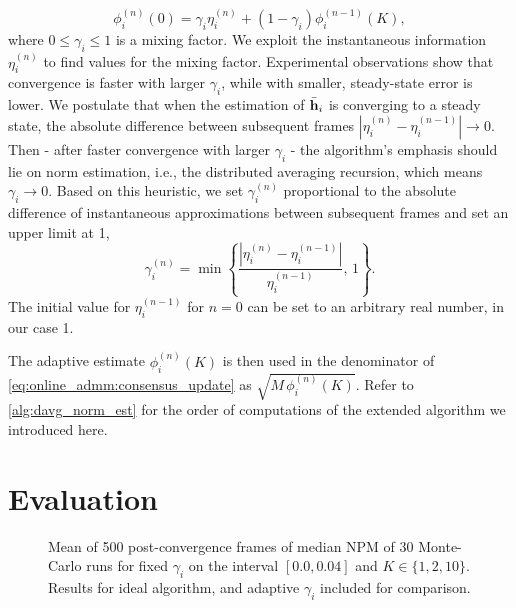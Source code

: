\documentclass{article}
\begin{document}
\begin{equation}
    \phi_i^{(n)}(0) = \gamma_i \eta_i^{(n)} + (1-\gamma_i) \phi_i^{(n-1)}(K),
\end{equation}
where \(0 \leq \gamma_i \leq 1\) is a mixing factor.
We exploit the instantaneous information \(\eta_i^{(n)}\) to find values for the mixing factor.
Experimental observations show that convergence is faster with larger \(\gamma_i\), while with smaller, steady-state error is lower.
We postulate that when the estimation of \(\bar{\bm{\mathrm{h}}}_i\) is converging to a steady state, the absolute difference between subsequent frames \(| \eta_i^{(n)} - \eta_i^{(n-1)} | \to 0\).
Then - after faster convergence with larger \(\gamma_i\) - the algorithm's emphasis should lie on norm estimation, i.e., the distributed averaging recursion, which means \(\gamma_i \to 0\).
Based on this heuristic, we set \(\gamma_i^{(n)}\) proportional to the absolute difference of instantaneous approximations between subsequent frames and set an upper limit at 1,
\begin{equation}
    \gamma_i^{(n)} = \min \left\lbrace \frac{| \eta_i^{(n)} - \eta_i^{(n-1)} |}{\eta_i^{(n-1)}},\,1\right\rbrace.\label{eq:adaptivenormest:adaptivegamma}
\end{equation}
The initial value for \(\eta_i^{(n-1)}\) for \(n=0\) can be set to an arbitrary real number, in our case 1.

The adaptive estimate \(\phi_i^{(n)}(K)\) is then used in the denominator of \eqref{eq:online_admm:consensus_update} as \(\sqrt{M \, \phi_i^{(n)}(K)}\).
Refer to \autoref{alg:davg_norm_est} for the order of computations of the extended algorithm we introduced here.

\section{Evaluation}
\label{sec:simulations}
\begin{figure}[t]
    \centering
    
    \vspace*{-0.6cm}
    \caption[]{Mean of 500 post-convergence frames of median NPM of 30 Monte-Carlo runs for fixed \(\gamma_i\) on the interval \([0.0, 0.04]\) and \(K \in \{1,2,10\}\). Results for ideal algorithm, and adaptive \(\gamma_i\) included for comparison.}
    \label{fig:simulations:avgNPMgamma}
\end{figure}
\end{document}
